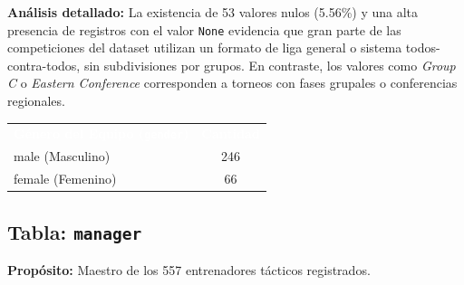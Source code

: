 \documentclass[12pt,a4paper]{article}
\newcommand{\thead}[1]{%
  \cellcolor{tableheader}\textcolor{white}{\textbf{#1}}%
}
\begin{document}
\textbf{Análisis detallado:} 
La existencia de 53 valores nulos (5.56\%) y una alta presencia de registros con el valor \texttt{None} evidencia que gran parte de las competiciones del dataset utilizan un formato de liga general o sistema todos-contra-todos, sin subdivisiones por grupos. En contraste, los valores como \textit{Group C} o \textit{Eastern Conference} corresponden a torneos con fases grupales o conferencias regionales.

\begin{center}
\begin{tabular}{lc}
\rowcolor{tableheader} \thead{Género del Equipo (\texttt{gender})} & \thead{Cantidad} \\
\rowcolor{tablealt} male (Masculino) & 246 \\
\rowcolor{tablerow} female (Femenino) & 66 \\
\end{tabular}
\end{center}

\subsection{Tabla: \texttt{manager}}

\textbf{Propósito:} Maestro de los 557 entrenadores tácticos registrados.
\end{document}
